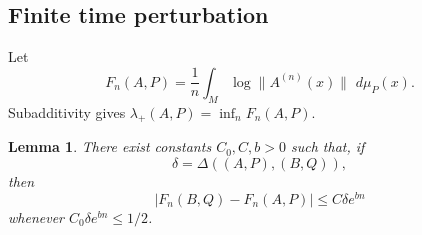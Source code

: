 \documentclass[11pt,a4paper]{amsart}
\newtheorem{lemma}[theorem]{Lemma}
\theoremstyle{definition}
\theoremstyle{remark}
\numberwithin{equation}{section}
\newcommand{\dd}{\,d}
\newcommand{\1}{\boldsymbol 1}
\begin{document}
\subsection{Finite time perturbation}
Let
\begin{equation}\label{eq:Fn}
 F_n(A,P)=\frac1n\int_M\log\|A^{(n)}(x)\|\,\dd\mu_P(x).
\end{equation}
Subadditivity gives $\lambda_+(A,P)=\inf_nF_n(A,P)$.

\begin{lemma}
\label{lem:finite-time-stability}
There exist constants $C_0,C,b>0$ such that, if
$$
 \delta=\Delta((A,P),(B,Q)),
$$
then
\begin{equation}\label{eq:finite-time-stability}
 |F_n(B,Q)-F_n(A,P)|\le C\delta e^{bn}
\end{equation}
whenever \(C_0\delta e^{bn}\le 1/2\).
\end{lemma}
\end{document}
